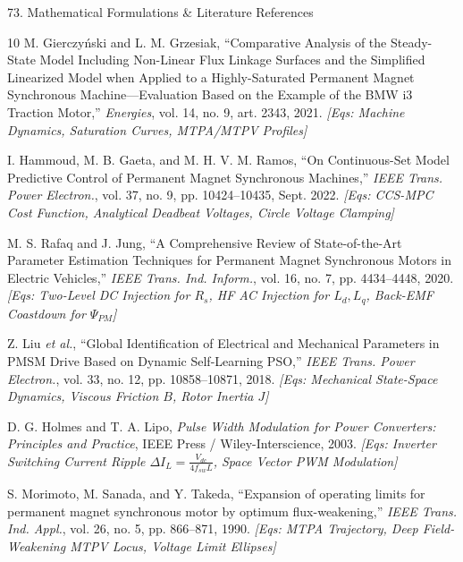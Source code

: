 \documentclass[aspectratio=169]{beamer}
\begin{document}
\begin{frame}{73. Mathematical Formulations \& Literature References}
    \tiny
    \begin{thebibliography}{10}
        \setlength{\itemsep}{2.5pt}
         M. Gierczy\'nski and L. M. Grzesiak, ``Comparative Analysis of the Steady-State Model Including Non-Linear Flux Linkage Surfaces and the Simplified Linearized Model when Applied to a Highly-Saturated Permanent Magnet Synchronous Machine---Evaluation Based on the Example of the BMW i3 Traction Motor,'' \textit{Energies}, vol. 14, no. 9, art. 2343, 2021. \hfill \textit{[Eqs: Machine Dynamics, Saturation Curves, MTPA/MTPV Profiles]}
        
         I. Hammoud, M. B. Gaeta, and M. H. V. M. Ramos, ``On Continuous-Set Model Predictive Control of Permanent Magnet Synchronous Machines,'' \textit{IEEE Trans. Power Electron.}, vol. 37, no. 9, pp. 10424--10435, Sept. 2022. \hfill \textit{[Eqs: CCS-MPC Cost Function, Analytical Deadbeat Voltages, Circle Voltage Clamping]}
        
         M. S. Rafaq and J. Jung, ``A Comprehensive Review of State-of-the-Art Parameter Estimation Techniques for Permanent Magnet Synchronous Motors in Electric Vehicles,'' \textit{IEEE Trans. Ind. Inform.}, vol. 16, no. 7, pp. 4434--4448, 2020. \hfill \textit{[Eqs: Two-Level DC Injection for $R_s$, HF AC Injection for $L_d, L_q$, Back-EMF Coastdown for $\Psi_{PM}$]}
        
         Z. Liu \textit{et al.}, ``Global Identification of Electrical and Mechanical Parameters in PMSM Drive Based on Dynamic Self-Learning PSO,'' \textit{IEEE Trans. Power Electron.}, vol. 33, no. 12, pp. 10858--10871, 2018. \hfill \textit{[Eqs: Mechanical State-Space Dynamics, Viscous Friction $B$, Rotor Inertia $J$]}
        
         D. G. Holmes and T. A. Lipo, \textit{Pulse Width Modulation for Power Converters: Principles and Practice}, IEEE Press / Wiley-Interscience, 2003. \hfill \textit{[Eqs: Inverter Switching Current Ripple $\Delta I_L = \frac{V_{dc}}{4 f_{sw} L}$, Space Vector PWM Modulation]}
        
         S. Morimoto, M. Sanada, and Y. Takeda, ``Expansion of operating limits for permanent magnet synchronous motor by optimum flux-weakening,'' \textit{IEEE Trans. Ind. Appl.}, vol. 26, no. 5, pp. 866--871, 1990. \hfill \textit{[Eqs: MTPA Trajectory, Deep Field-Weakening MTPV Locus, Voltage Limit Ellipses]}
    \end{thebibliography}
\end{frame}
\end{document}
